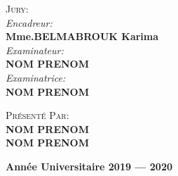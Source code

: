 \documentclass[12pt, openany]{report}
\begin{document}
\begin{titlepage}
\begin{sffamily}
\begin{center}
    \begin{minipage}{0.4\textwidth}
      \begin{flushleft} \large
        \textsc{\Large Jury:}\\[0.5cm]
        \textit{Encadreur:}\\  
        \textbf{Mme.BELMABROUK Karima}\\
        \textit{Examinateur:}\\
        \textbf{NOM PRENOM}\\
        \textit{Examinatrice:}\\
        \textbf{NOM PRENOM}\\
      \end{flushleft}
    \end{minipage}
    \begin{minipage}{0.4\textwidth}
      \begin{flushright} \large
        \textsc{\Large Présenté Par:}\\
        \textbf{NOM PRENOM}\\
        \textbf{NOM PRENOM}\\
      \end{flushright}
    \end{minipage}

    \vfill

    \textbf{\large Année Universitaire 2019 — 2020 }
  \end{center}
  \end{sffamily}
\end{titlepage}
\end{document}
